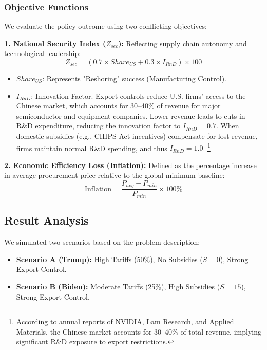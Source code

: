 \documentclass{apmcmthesis}
\begin{document}
\subsubsection{Objective Functions}
We evaluate the policy outcome using two conflicting objectives:

\textbf{1. National Security Index ($Z_{sec}$):}
Reflecting supply chain autonomy and technological leadership:
\begin{equation}
    Z_{sec} = (0.7 \times Share_{US} + 0.3 \times I_{RnD}) \times 100
\end{equation}
\begin{itemize}
    \item $Share_{US}$: Represents "Reshoring" success (Manufacturing Control).
    \item $I_{RnD}$: Innovation Factor. Export controls reduce U.S. firms’ access to the
Chinese market, which accounts for 30--40\% of revenue for major semiconductor
and equipment companies. Lower revenue leads to cuts in R\&D expenditure,
reducing the innovation factor to $I_{RnD} = 0.7$. When domestic subsidies
(e.g., CHIPS Act incentives) compensate for lost revenue, firms maintain normal
R\&D spending, and thus $I_{RnD} = 1.0$.
\footnote{According to annual reports of NVIDIA, Lam Research, and Applied Materials, 
the Chinese market accounts for 30--40\% of total revenue, implying significant
R\&D exposure to export restrictions.}


\end{itemize}

\textbf{2. Economic Efficiency Loss (Inflation):}
Defined as the percentage increase in average procurement price relative to the global minimum baseline:
\begin{equation}
    \text{Inflation} = \frac{P_{avg} - P_{min}}{P_{min}} \times 100\%
\end{equation}

\subsection{Result Analysis}
We simulated two scenarios based on the problem description:
\begin{itemize}
    \item \textbf{Scenario A (Trump):} High Tariffs (50\%), No Subsidies ($S=0$), Strong Export Control.
    \item \textbf{Scenario B (Biden):} Moderate Tariffs (25\%), High Subsidies ($S=15$), Strong Export Control.
\end{itemize}
\end{document}
